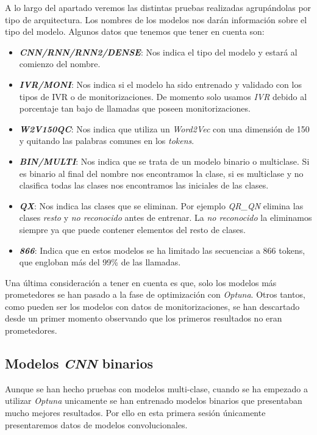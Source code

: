 A lo largo del apartado veremos las distintas pruebas realizadas agrupándolas por tipo de arquitectura. Los nombres de los modelos nos darán
información sobre el tipo del modelo. Algunos datos que tenemos que
tener en cuenta son:
\begin{itemize}
 

\item \textbf{\textit{CNN/RNN/RNN2/DENSE}}: Nos indica el tipo del modelo y estará al comienzo
del nombre.

\item \textbf{\textit{IVR/MONI}}: Nos indica si el modelo ha sido entrenado y validado con los
tipos de IVR o de monitorizaciones. De momento solo usamos \textit{IVR} debido al porcentaje tan bajo de llamadas que poseen monitorizaciones.

\item \textbf{\textit{W2V150QC}}: Nos indica que utiliza un \textit{Word2Vec} con una dimensión de 150 y
quitando las palabras comunes en los \textit{tokens}.

\item \textbf{\textit{BIN/MULTI}}: Nos indica que se trata de un modelo binario o multiclase. Si
es binario al final del nombre nos encontramos la clase, si es multiclase y
no clasifica todas las clases nos encontramos las iniciales de las
clases.

\item \textbf{\textit{QX}}: Nos indica las clases que se eliminan. Por ejemplo \textit{QR\_QN} elimina
las clases \textit{resto} y \textit{no reconocido} antes de entrenar. La \textit{no reconocido} la
eliminamos siempre ya que puede contener elementos del resto de clases.

\item \textbf{\textit{866}}: Indica que en estos modelos se ha limitado las secuencias a 866
tokens, que engloban más del 99\% de las llamadas.

 \end{itemize}

Una última consideración a tener en cuenta es que, solo los modelos más prometedores se han pasado a la fase de optimización con \textit{Optuna}. Otros tantos, como pueden ser los modelos con datos de monitorizaciones, se han descartado desde un primer momento observando que los primeros resultados no eran prometedores.

\subsection{Modelos \textit{CNN} binarios}
Aunque se han hecho pruebas con modelos multi-clase, cuando se ha
empezado a utilizar \textit{Optuna} unicamente se han entrenado modelos binarios
que presentaban mucho mejores resultados. Por ello en esta primera sesión únicamente presentaremos datos de modelos convolucionales. 

